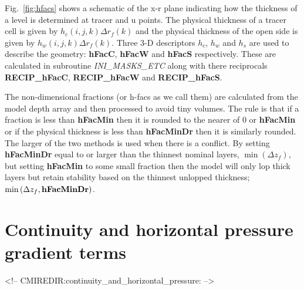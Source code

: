 Fig.~\ref{fig:hfacs} shows a schematic of the x-r plane indicating how
the thickness of a level is determined at tracer and u points.
The physical thickness of a tracer cell is given by $h_c(i,j,k) \Delta
r_f(k)$ and the physical thickness of the open side is given by
$h_w(i,j,k) \Delta r_f(k)$. Three 3-D descriptors $h_c$, $h_w$ and
$h_s$ are used to describe the geometry: {\bf hFacC}, {\bf hFacW} and
{\bf hFacS} respectively. These are calculated in subroutine {\em
INI\_MASKS\_ETC} along with there reciprocals {\bf RECIP\_hFacC}, {\bf
RECIP\_hFacW} and {\bf RECIP\_hFacS}.

The non-dimensional fractions (or h-facs as we call them) are
calculated from the model depth array and then processed to avoid tiny
volumes. The rule is that if a fraction is less than {\bf hFacMin}
then it is rounded to the nearer of $0$ or {\bf hFacMin} or if the
physical thickness is less than {\bf hFacMinDr} then it is similarly
rounded. The larger of the two methods is used when there is a
conflict. By setting {\bf hFacMinDr} equal to or larger than the
thinnest nominal layers, $\min{(\Delta z_f)}$, but setting {\bf
hFacMin} to some small fraction then the model will only lop thick
layers but retain stability based on the thinnest unlopped thickness;
$\min{(\Delta z_f,\mbox{\bf hFacMinDr})}$.



\section{Continuity and horizontal pressure gradient terms}
\begin{rawhtml}
<!-- CMIREDIR:continuity_and_horizontal_pressure: -->
\end{rawhtml}


